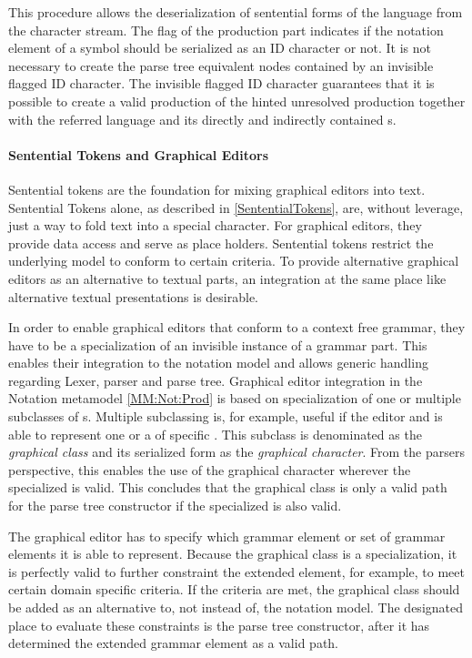This procedure allows the deserialization of sentential forms of the language from the character stream. The  flag of the production part indicates if the notation element of a symbol should be serialized as an ID character or not. It is not necessary to create the parse tree equivalent nodes contained by an invisible flagged ID character. The invisible flagged ID character guarantees that it is possible to create a valid production of the hinted unresolved production together with the referred language  and its directly and indirectly contained s.

\paragraph{Sentential Tokens and Graphical Editors}
Sentential tokens are the foundation for mixing graphical editors into text. Sentential Tokens alone, as described in \ref{SententialTokens}, are, without leverage, just a way to fold text into a special character.  For graphical editors, they provide data access and serve as place holders. Sentential tokens restrict the underlying model to conform to certain criteria. To provide alternative graphical editors as an alternative to textual parts, an integration at the same place like alternative textual presentations is desirable.

In order to enable graphical editors that conform to a context free grammar, they have to be a specialization of an invisible instance of a grammar part. This enables their integration to the notation model and allows generic handling regarding Lexer, parser and parse tree. Graphical editor integration in the Notation metamodel \ref{MM:Not:Prod} is based on specialization of one or multiple subclasses of s. Multiple subclassing is, for example, useful if the editor and is able to represent one or a  of specific . This subclass is denominated as the \emph{graphical class} and its serialized form as the \emph{graphical character}. From the parsers perspective, this enables the use of the graphical character wherever the specialized  is valid. This concludes that the graphical class is only a valid path for the parse tree constructor if the specialized  is also valid. 

The graphical editor has to specify which grammar element or set of grammar elements it is able to represent. Because the graphical class is a specialization, it is perfectly valid to further constraint the extended element, for example, to meet certain domain specific criteria. If the criteria are met, the graphical class should be added as an alternative to, not instead of, the notation model. The designated place to evaluate these constraints is the parse tree constructor, after it has determined the extended grammar element as a valid path. 

